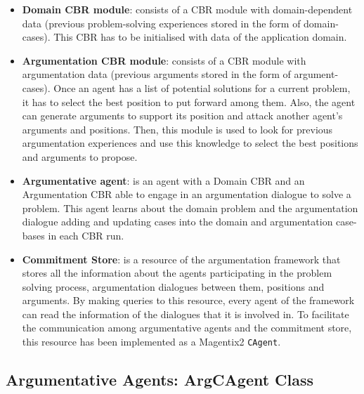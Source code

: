 \begin{itemize}
 \item \textbf{Domain CBR module}: consists of a CBR module with domain-dependent data (previous problem-solving experiences stored in the form of domain-cases). This CBR has to be initialised with data of the application domain.

 \item \textbf{Argumentation CBR module}: consists of a CBR module with argumentation data (previous arguments stored in the form of argument-cases). Once an agent has a list of potential solutions for a current problem, it has to select the best position to put forward among them. Also, the agent can generate arguments to support its position and attack another agent's arguments and positions. Then, this module is used to look for previous argumentation experiences and use this knowledge to select the best positions and arguments to propose.

 \item \textbf{Argumentative agent}: is an agent with a Domain CBR and an Argumentation CBR able to engage in an argumentation dialogue to solve a problem. This agent learns about the domain problem and the argumentation dialogue adding and updating cases into the domain and argumentation case-bases in each CBR run. %

 \item \textbf{Commitment Store}: is a resource of the argumentation framework that stores all the information about the agents participating in the problem solving process, argumentation dialogues between them, positions and arguments. By making queries to this resource, every agent of the framework can read the information of the dialogues that it is involved in. To facilitate the communication among argumentative agents and the commitment store, this resource has been implemented as a Magentix2 \texttt{CAgent}.

\end{itemize}

\subsection{Argumentative Agents: ArgCAgent Class}
\label{subsubsec:argCAgents}

